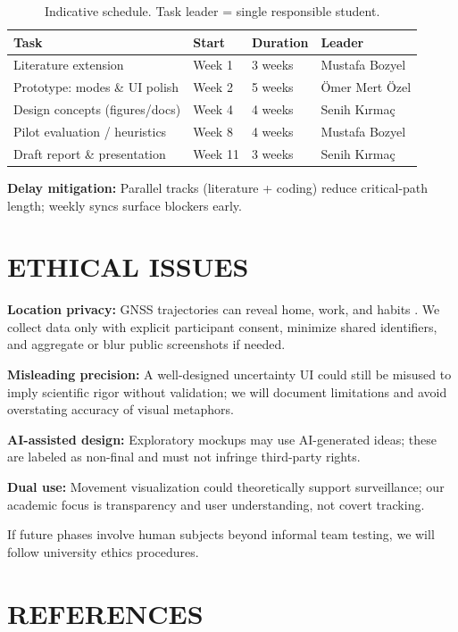 \documentclass[12pt,a4paper]{article}
\begin{document}
\begin{table}[h]
    \centering
    \caption{Indicative schedule. Task leader = single responsible student.}
    \label{tab:schedule}
    \small
    \begin{tabular}{@{}lllp{3.2cm}@{}}
        \toprule
        \textbf{Task} & \textbf{Start} & \textbf{Duration} & \textbf{Leader} \\
        \midrule
        Literature extension & Week 1 & 3 weeks & Mustafa Bozyel \\
        Prototype: modes \& UI polish & Week 2 & 5 weeks & Ömer Mert Özel \\
        Design concepts (figures/docs) & Week 4 & 4 weeks & Senih Kırmaç \\
        Pilot evaluation / heuristics & Week 8 & 4 weeks & Mustafa Bozyel \\
        Draft report \& presentation & Week 11 & 3 weeks & Senih Kırmaç \\
        \bottomrule
    \end{tabular}
\end{table}

\noindent\textbf{Delay mitigation:} Parallel tracks (literature + coding) reduce critical-path length; weekly syncs surface blockers early.

\section{ETHICAL ISSUES}

\textbf{Location privacy:} GNSS trajectories can reveal home, work, and habits \cite{Zheng2015,Sobral2019}. We collect data only with explicit participant consent, minimize shared identifiers, and aggregate or blur public screenshots if needed.

\textbf{Misleading precision:} A well-designed uncertainty UI could still be misused to imply scientific rigor without validation; we will document limitations and avoid overstating accuracy of visual metaphors.

\textbf{AI-assisted design:} Exploratory mockups may use AI-generated ideas; these are labeled as non-final and must not infringe third-party rights.

\textbf{Dual use:} Movement visualization could theoretically support surveillance; our academic focus is transparency and user understanding, not covert tracking.

\noindent If future phases involve human subjects beyond informal team testing, we will follow university ethics procedures.

\section{REFERENCES}



\end{document}
